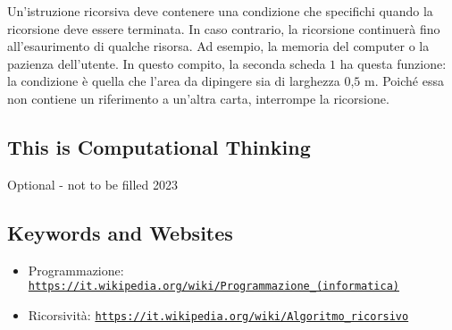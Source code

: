 \documentclass[a4paper,11pt]{report}
\newcommand{\BrochureUrlText}[1]{\texttt{#1}}
\begin{document}
Un’istruzione ricorsiva deve contenere una condizione che specifichi quando la ricorsione deve essere terminata. In caso contrario, la ricorsione continuerà fino all’esaurimento di qualche risorsa. Ad esempio, la memoria del computer o la pazienza dell’utente. In questo compito, la seconda scheda $1$ ha questa funzione: la condizione è quella che l’area da dipingere sia di larghezza $0$,$5$ m. Poiché essa non contiene un riferimento a un’altra carta, interrompe la ricorsione.


\subsection*{This is Computational Thinking}

Optional - not to be filled 2023

{\raggedright

\subsection*{Keywords and Websites}

\begin{itemize}
  \item Programmazione: \href{https://it.wikipedia.org/wiki/Programmazione_(informatica)}{\BrochureUrlText{https://it.wikipedia.org/wiki/Programmazione\_(informatica)}}
  \item Ricorsività: \href{https://it.wikipedia.org/wiki/Algoritmo_ricorsivo}{\BrochureUrlText{https://it.wikipedia.org/wiki/Algoritmo\_ricorsivo}}
\end{itemize}


}
\end{document}
